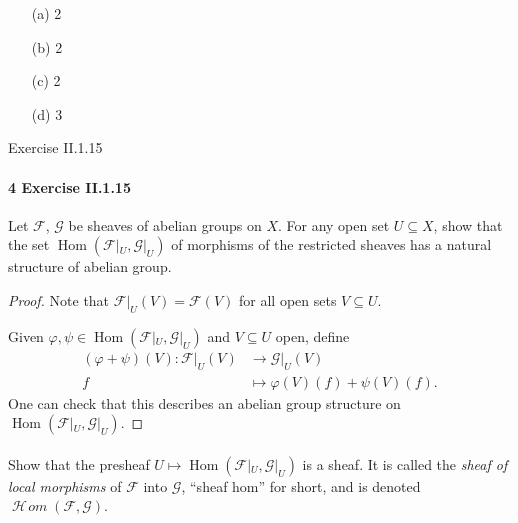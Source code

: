 \documentclass[12pt]{article}
\newlength{\myparskip}
\newenvironment{fullbox}{\begin{lrbox}{\savefullbox}\begin{minipage}{\dimexpr\textwidth-2\fboxsep\relax}\setlength{\parskip}{\myparskip}}{\end{minipage}\end{lrbox}\framebox[\textwidth]{\usebox{\savefullbox}}}
\newenvironment{pbox}[1][]{\begin{fullbox}\ifx#1\empty\else\paragraph{#1}\fi}{\end{fullbox}}
\renewcommand{\phi}{\varphi}
\newcommand{\<}{\langle}
\renewcommand{\>}{\rangle}
\newcommand{\FF}{\mathcal{F}}
\newcommand{\GG}{\mathcal{G}}
\DeclareMathOperator{\Hom}{Hom}
\DeclareMathOperator{\shHom}{\mathcal{H}\!\textit{om}}
\begin{document}
\begin{enumerate}
    \item[(a)] 2
    \item[(b)] 2
    \item[(c)] 2
    \item[(d)] 3  
\end{enumerate}



\newpage
\begin{pbox}[4 Exercise II.1.15]
    Let $\FF$, $\GG$ be sheaves of abelian groups on $X$. For any open set $U \subseteq X$, show that the set $\Hom(\FF|_U, \GG|_U)$ of morphisms of the restricted sheaves has a natural structure of abelian group. 
\end{pbox}

\begin{proof}
    Note that $\FF|_U(V) = \FF(V)$ for all open sets $V \subseteq U$.

    Given $\phi, \psi \in \Hom(\FF|_U, \GG|_U)$ and $V \subseteq U$ open, define
    \begin{align*}
        (\phi + \psi)(V) : \FF|_U(V) &\longrightarrow \GG|_U(V) \\
            f &\longmapsto \phi(V)(f) + \psi(V)(f).
    \end{align*}
    One can check that this describes an abelian group structure on $\Hom(\FF|_U, \GG|_U)$.
\end{proof}

\begin{pbox}
    Show that the presheaf $U \mapsto \Hom(\FF|_U, \GG|_U)$ is a sheaf. It is called the \textit{sheaf of local morphisms} of $\FF$ into $\GG$, ``sheaf hom'' for short, and is denoted $\shHom(\FF, \GG)$.
\end{pbox}
\end{document}
